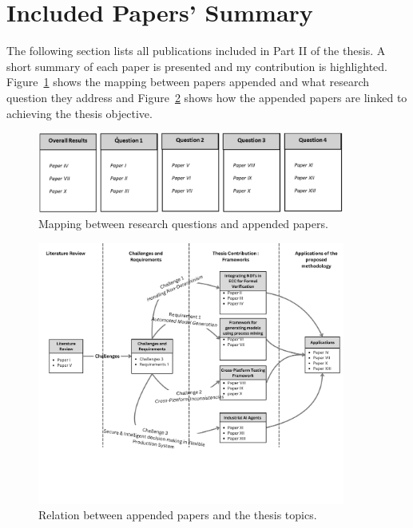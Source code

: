 \section{Included Papers' Summary}
The following section lists all publications included in Part II of the thesis. A short summary of each paper is presented and my contribution is highlighted. Figure~\ref{fig:ch1:research_mapping} shows the mapping between papers appended and what research question they address and Figure~\ref{fig:ch1:paper_relationship} shows how the appended papers are linked to achieving the thesis objective.

\begin{figure}[htbp]
    \centering
    \includegraphics[width=0.9\textwidth]{chapters/images/chapter1/relationship_papers_researchquestions.png}
    \caption{Mapping between research questions and appended papers.}
    \label{fig:ch1:research_mapping}
\end{figure}

\begin{figure}[htbp]
    \centering
    \includegraphics[width=0.9\textwidth]{chapters/images/chapter1/Literature Review.png}
    \caption{Relation between appended papers and the thesis topics.}
    \label{fig:ch1:paper_relationship}
\end{figure}


